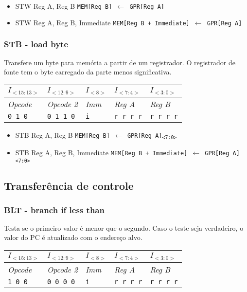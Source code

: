 \documentclass[11pt,a4paper]{report}
\begin{document}
\begin{itemize}
\item STW Reg A, Reg B
\subitem \texttt{MEM[Reg B] $\leftarrow$ GPR[Reg A]}
\item STW Reg A, Reg B, Immediate
\subitem \texttt{MEM[Reg B + Immediate] $\leftarrow$ GPR[Reg A]}
\end{itemize}

\subsubsection{STB - load byte}

Transfere um byte para memória a partir de um registrador. O registrador
de fonte tem o byte carregado da parte menos significativa.

\begin{table}[htb!]
\centering
\begin{tabular}{|p{2cm}|p{2cm}|p{2cm}|p{2cm}|p{2cm}|}
\hline
$I_{<15:13>}$ & $I_{<12:9>}$ & $I_{<8>}$ & $I_{<7:4>}$ & $I_{<3:0>}$  \\ \hline
\textit{Opcode} & \textit{Opcode 2} & \textit{Imm} & \textit{Reg A} & \textit{Reg B} \\ \hline
\texttt{0 1 0} & \texttt{0 1 1 0} & \texttt{i} & \texttt{r r r r} & \texttt{r r r r} \\ \hline
\end{tabular}
\end{table}

\begin{itemize}
\item STB Reg A, Reg B
\subitem \texttt{MEM[Reg B] $\leftarrow$ GPR[Reg A]\textsubscript{<7:0>}}
\item STB Reg A, Reg B, Immediate
\subitem \texttt{MEM[Reg B + Immediate] $\leftarrow$ GPR[Reg A]\textsubscript{<7:0>}}
\end{itemize}


\subsection{Transferência de controle}

\subsubsection{BLT - branch if less than}
Testa se o primeiro valor é menor que o segundo. Caso o teste seja
verdadeiro, o valor do PC é atualizado com o endereço alvo.

\begin{table}[htb!]
\centering
\begin{tabular}{|p{2cm}|p{2cm}|p{2cm}|p{2cm}|p{2cm}|}
\hline
$I_{<15:13>}$ & $I_{<12:9>}$ & $I_{<8>}$ & $I_{<7:4>}$ & $I_{<3:0>}$  \\ \hline
\textit{Opcode} & \textit{Opcode 2} & \textit{Imm} & \textit{Reg A} & \textit{Reg B} \\ \hline
\texttt{1 0 0} & \texttt{0 0 0 0} & \texttt{i} & \texttt{r r r r} & \texttt{r r r r} \\ \hline
\end{tabular}
\end{table}
\end{document}
